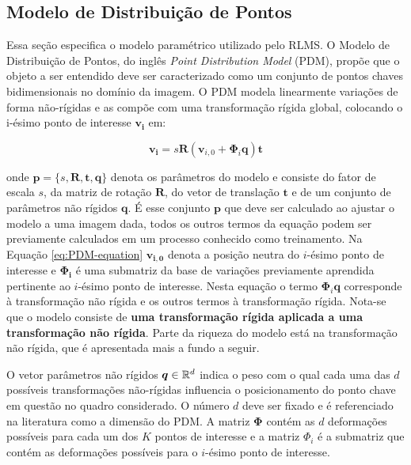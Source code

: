{\subsection{Modelo de Distribuição de Pontos}

Essa seção especifica o modelo paramétrico utilizado pelo RLMS. O Modelo de
Distribuição de Pontos, do inglês  \textit{Point Distribution Model} (PDM), propõe que o objeto a ser
entendido deve ser caracterizado como um conjunto de pontos chaves
bidimensionais no domínio da imagem. O PDM modela linearmente variações de forma
não-rígidas e as compõe com uma transformação rígida global, colocando o i-ésimo
ponto de interesse $\bm{v_i}$ em:

\begin{equation}
 \bm{v_i} = s \bm{R} ( \bm{v}_{i,0} + \bm{\Phi}_i \bm{q}) \bm{t}
\label{eq:PDM-equation}
\end{equation}
 
onde $\mathbf{p}=\{s,\bm{R},\bm{t},\bm{q}\}$ denota os parâmetros do modelo e
consiste do fator de escala $s$, da matriz de rotação $\bm{R}$, do vetor de
translação $\bm{t}$ e de um conjunto de parâmetros não rígidos $\bm{q}$. É esse
conjunto $\mathbf{p}$ que deve ser calculado ao ajustar o modelo a uma imagem
dada, todos os outros termos da equação podem ser previamente calculados em um
processo conhecido como treinamento.  Na Equação \ref{eq:PDM-equation}
$\bm{v_{i,0}}$ denota a posição neutra do $i$-ésimo ponto de interesse e
$\bm{\Phi_i}$ é uma submatriz da base de variações previamente aprendida
pertinente ao $i$-ésimo ponto de interesse.  Nesta equação o termo $\bm{\Phi}_i
\bm{q}$ corresponde à transformação não rígida e os outros termos à
transformação rígida. Nota-se que o modelo consiste de \textbf{uma transformação
rígida aplicada a uma transformação não rígida}. Parte da riqueza do modelo está
na transformação não rígida, que é apresentada mais a fundo a seguir.

O vetor parâmetros não rígidos $\bm{q} \in \mathbb{R} ^d$ indica o peso com o
qual cada uma das $d$ possíveis transformações não-rígidas influencia o
posicionamento do ponto chave em questão no quadro considerado. O número $d$
deve ser fixado e é referenciado na literatura como a dimensão do PDM. A matriz
$\bm{\Phi}$ contém as $d$ deformações possíveis para cada um dos $K$ pontos de
interesse e a matriz $\Phi_i$ é a submatriz que contém as deformações possíveis
para o $i$-ésimo ponto de interesse.

}
